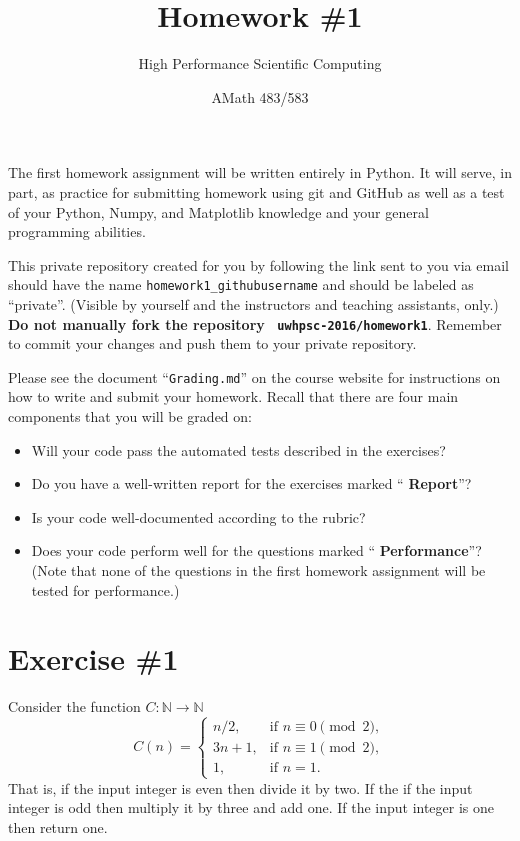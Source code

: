 \documentclass[12pt]{article}
\title{Homework \#1}
\author{High Performance Scientific Computing}
\date{AMath 483/583}
\begin{document}
\maketitle

The first homework assignment will be written entirely in Python. It will serve,
in part, as practice for submitting homework using git and GitHub as well as a
test of your Python, Numpy, and Matplotlib knowledge and your general
programming abilities.

This private repository created for you by following the link sent to you via
email should have the name {\tt homework1\_githubusername} and should be labeled
as ``private''. (Visible by yourself and the instructors and teaching
assistants, only.) {\bf Do not manually fork the repository {\tt
    uwhpsc-2016/homework1}}. Remember to commit your changes and push them to
your private repository.

Please see the document ``{\tt Grading.md}'' on the course website for
instructions on how to write and submit your homework. Recall that there are
four main components that you will be graded on:
\begin{itemize}
\item Will your code pass the automated tests described in the exercises?
\item Do you have a well-written report for the exercises marked ``{\bf
    Report}''?
\item Is your code well-documented according to the rubric?
\item Does your code perform well for the questions marked ``{\bf
    Performance}''? (Note that none of the questions in the first homework
  assignment will be tested for performance.)
\end{itemize}



\section*{Exercise \#1}



Consider the function $C : \mathbb{N} \to \mathbb{N}$
\[
  C(n) = 
  \begin{cases}
    n/2,    & \text{if } n \equiv 0 \pmod{2}, \\
    3n + 1, & \text{if } n \equiv 1 \pmod{2}, \\
    1, & \text{if } n = 1.
  \end{cases}
\]
That is, if the input integer is even then divide it by two. If the if the input
integer is odd then multiply it by three and add one. If the input integer is
one then return one.
\end{document}

